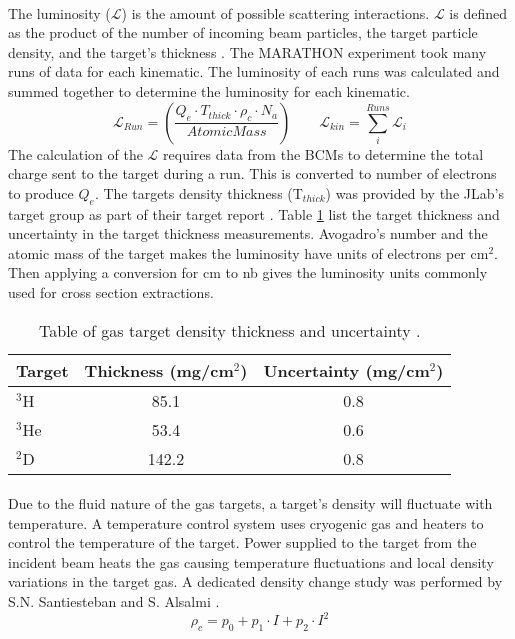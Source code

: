 \paragraph{} The luminosity ($\mathscr{L}$) is the amount of possible scattering interactions. $\mathscr{L}$ is defined as the product of the number of incoming beam particles, the target particle density, and the target's thickness \cite{PnN}. The MARATHON experiment took many runs of data for each kinematic. The luminosity of each runs was calculated and summed together to determine the luminosity for each kinematic. 
\begin{equation}
	\mathscr{L}_{Run} =  \left(\frac{Q_e \cdot T_{thick} \cdot \rho_c \cdot N_a}{AtomicMass} \right) \qquad
	\mathscr{L}_{kin} = \sum_i^{Runs} \mathscr{L}_{i}
\end{equation}
The calculation of the $\mathscr{L}$ requires data from the BCMs to determine the total charge sent to the target during a run. This is converted to number of electrons to produce $Q_e$. The targets density thickness (T$_{thick}$) was provided by the JLab's target group as part of their target report \cite{HATT_eng}. Table \ref{tgt_table} list the target thickness and uncertainty in the target thickness measurements.  Avogadro's number and the atomic mass of the target makes the luminosity have units of electrons per cm$^2$. Then applying a conversion for cm to nb gives the luminosity units commonly used for cross section extractions.
\begin{table}[]
	\caption{Table of gas target density thickness and uncertainty \cite{HATT_eng}. \label{tgt_table}}
	\centering
	\begin{tabular}{lcc}
	\hline
	Target &Thickness (mg/cm$^2$) & Uncertainty (mg/cm$^2$)   \\
	\hline
	$^3$H & 85.1 & 0.8 \\
	$^3$He & 53.4 & 0.6\\
	$^2$D & 142.2 & 0.8\\
	\hline
	\end{tabular}
\end{table}
\paragraph{}  Due to the fluid nature of the gas targets, a target's density will fluctuate with temperature. A temperature control system uses cryogenic gas and heaters to control the temperature of the target. Power supplied to the target from the incident beam heats the gas causing temperature fluctuations and local density variations in the target gas. A dedicated density change study was performed by S.N. Santiesteban and S. Alsalmi \cite{denscor}.
\begin{equation}
\rho_c = p_0 + p_1 \cdot I + p_2 \cdot I^2 \label{eq:dc}
\end{equation}
